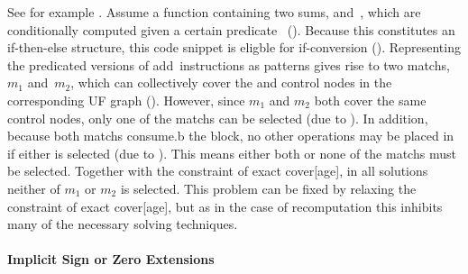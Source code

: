 %
See for example .
%
Assume a \gls{function} containing two sums,  and~, which are
conditionally computed given a certain predicate~
().
%
Because this constitutes an if-then-else structure, this code snippet is eligble
for \gls{if-conversion} ().
%
Representing the predicated versions of add~\glspl{instruction} as
\glspl{pattern} gives rise to two \glspl{match}, $m_1$ and~$m_2$, which can
collectively cover the  and \glspl{control node} in
the corresponding \gls{UF graph} ().
%
However, since $m_1$ and $m_2$ both cover the same \glspl{control node}, only
one of the \glspl{match} can be selected (due to
).
%
In addition, because both \glspl{match} \gls{consume.b} the 
\gls{block}, no other \glspl{operation} may be placed in  if
either is selected (due to ).
%
This means either both or none of the \glspl{match} must be selected.
%
Together with the \gls{constraint} of exact \gls{cover}[age], in all
\glspl{solution} neither of $m_1$ or $m_2$ is selected.
%
This problem can be fixed by relaxing the \gls{constraint} of exact
\gls{cover}[age], but as in the case of \gls{recomputation} this inhibits many
of the necessary solving techniques.


\paragraph{Implicit Sign or Zero Extensions}

